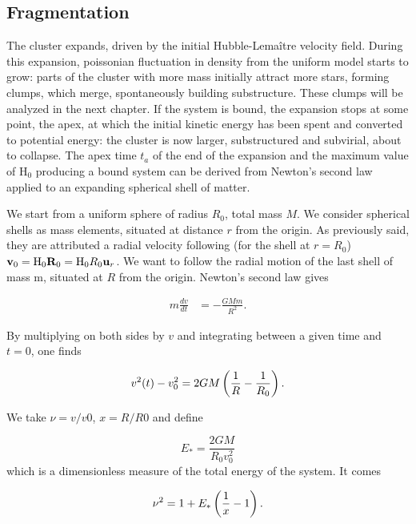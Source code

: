 \subsection{Fragmentation}
\label{Sec:1_apextime}

The cluster expands, driven by the initial Hubble-Lema\^itre velocity field. During this expansion, poissonian fluctuation in density from the uniform model starts to grow: parts of the cluster with more mass initially attract more stars, forming clumps, which merge, spontaneously building substructure. These clumps will be analyzed in the next chapter. If the system is bound, the expansion stops at some point, the apex, at which the initial kinetic energy has been spent and converted to potential energy: the cluster is now larger, substructured and subvirial, about to collapse. The apex time $t_a$ of the end of the expansion and the maximum value of H$_0$ producing a bound system can be derived from Newton's second law applied to an expanding spherical shell of matter.

We start from a uniform sphere of radius $R_0$, total mass $M$. We consider spherical shells as mass elements, situated at distance $r$ from the origin. As previously said, they are attributed a radial velocity following (for the shell at $r=R_0$) $\bold v_0 = {\textrm{H}}_0 \bold R_0 = {\textrm{H}}_0 R_0 \bold u_r$. We want to follow the radial motion of the last shell of mass m, situated at $R$ from the origin. Newton's second law gives


\begin{align}\label{eq:newton}
m \frac{dv}{dt} & = - \frac{G M m}{R^2}.
\end{align}

By multiplying on both sides by $v$ and integrating between a given time and $t=0$, one finds

\begin{equation}
v^2(t) - v^2_0 = 2GM \left( \frac{1}{R} - \frac{1}{R_0} \right).
\end{equation}

We take $\nu = v/v0$,  $x= R/R0$ and define

\begin{equation}
\label{Eq:1_Estar}
E_\ast = \frac{2GM}{R_0 v_0^2}
\end{equation}
which is a dimensionless measure of the total energy of the system. It comes

\begin{equation}
\nu^2  = 1 + E_\ast \left( \frac{1}{x} - 1 \right).
\end{equation}

